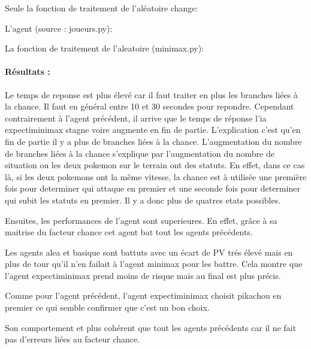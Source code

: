                 Seule la fonction de traitement de l'aléatoire change:
                
                L'agent (source : joueurs.py):
                
                
                
                La fonction de traitement de l'aleatoire (minimax.py):
                
                
                
            \paragraph{Résultats :}
                Le temps de reponse est plus élevé car il faut traiter en plus les branches liées à la chance. Il faut en général entre 10 et 30 secondes pour repondre. Cependant contrairement à l'agent précédent, il arrive que le temps de réponse l'ia expectiminimax stagne voire augmente en fin de partie. L'explication c'est qu'en fin de partie il y a plus de branches liées à la chance. L'augmentation du nombre de branches liées à la chance s'explique par l'augmentation du nombre de situation ou les deux pokemon sur le terrain ont des statuts. En effet, dans ce cas là, si les deux pokemons ont la même vitesse, la chance est à utilisée une première fois pour determiner qui attaque en premier et une seconde fois pour determiner qui subit les statuts en premier. Il y a donc plus de quatres etats possibles.
                
                Ensuites, les performances de l'agent sont superieures. En effet, grâce à sa maitrise du facteur chance cet agent bat tout les agents précédents.
                
                Les agents alea et basique sont battuts avec un écart de PV trés élevé mais en plus de tour qu'il n'en failait à l'agent minimax pour les battre. Cela montre que l'agent expectiminimax prend moins de risque mais au final est plus précis.
                
                Comme pour l'agent précédent, l'agent expectiminimax choisit pikachou en premier ce qui semble confirmer que c'est un bon choix.
                
                Son comportement et plus cohérent que tout les agents précédents car il ne fait pas d'erreurs liées au facteur chance.
                
